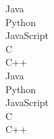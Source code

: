 \documentclass[]{friggeri-cv} %
\begin{document}
\noindent\begin{minipage}[t]{0.5\linewidth}
\begin{flushright}

Java\quad{\color{red} $\varheartsuit\varheartsuit\varheartsuit\varheartsuit\varheartsuit\varheartsuit\varheartsuit\varheartsuit\varheartsuit\varheartsuit\varheartsuit\varheartsuit\varheartsuit\varheartsuit\varheartsuit$}{\color{black} $\varheartsuit$} \\
Python\quad{\color{red} $\varheartsuit\varheartsuit\varheartsuit\varheartsuit\varheartsuit\varheartsuit\varheartsuit\varheartsuit\varheartsuit\varheartsuit\varheartsuit\varheartsuit\varheartsuit$}{\color{black} $\varheartsuit\varheartsuit\varheartsuit$} \\ 
JavaScript\quad{\color{red} $\varheartsuit\varheartsuit\varheartsuit\varheartsuit\varheartsuit\varheartsuit\varheartsuit\varheartsuit\varheartsuit\varheartsuit\varheartsuit\varheartsuit\varheartsuit\varheartsuit$}{\color{black} $\varheartsuit\varheartsuit$} \\ 
 C\quad{\color{red} $\varheartsuit\varheartsuit\varheartsuit\varheartsuit\varheartsuit\varheartsuit\varheartsuit\varheartsuit\varheartsuit\varheartsuit\varheartsuit\varheartsuit\varheartsuit\varheartsuit$}{\color{black} $\varheartsuit\varheartsuit$} \\
 C++\quad{\color{red} $\varheartsuit\varheartsuit\varheartsuit\varheartsuit\varheartsuit\varheartsuit\varheartsuit\varheartsuit\varheartsuit\varheartsuit\varheartsuit\varheartsuit\varheartsuit\varheartsuit$}{\color{black} $\varheartsuit\varheartsuit$} \\
Java\quad{\color{red} $\varheartsuit\varheartsuit\varheartsuit\varheartsuit\varheartsuit\varheartsuit\varheartsuit\varheartsuit\varheartsuit\varheartsuit\varheartsuit\varheartsuit\varheartsuit\varheartsuit\varheartsuit$}{\color{black} $\varheartsuit$} \\
Python\quad{\color{red} $\varheartsuit\varheartsuit\varheartsuit\varheartsuit\varheartsuit\varheartsuit\varheartsuit\varheartsuit\varheartsuit\varheartsuit\varheartsuit\varheartsuit\varheartsuit$}{\color{black} $\varheartsuit\varheartsuit\varheartsuit$} \\ 
JavaScript\quad{\color{red} $\varheartsuit\varheartsuit\varheartsuit\varheartsuit\varheartsuit\varheartsuit\varheartsuit\varheartsuit\varheartsuit\varheartsuit\varheartsuit\varheartsuit\varheartsuit\varheartsuit$}{\color{black} $\varheartsuit\varheartsuit$} \\ 
 C\quad{\color{red} $\varheartsuit\varheartsuit\varheartsuit\varheartsuit\varheartsuit\varheartsuit\varheartsuit\varheartsuit\varheartsuit\varheartsuit\varheartsuit\varheartsuit\varheartsuit\varheartsuit$}{\color{black} $\varheartsuit\varheartsuit$} \\
 C++\quad{\color{red} $\varheartsuit\varheartsuit\varheartsuit\varheartsuit\varheartsuit\varheartsuit\varheartsuit\varheartsuit\varheartsuit\varheartsuit\varheartsuit\varheartsuit\varheartsuit\varheartsuit$}{\color{black} $\varheartsuit\varheartsuit$} \\
 \end{flushright}

    \end{minipage}%
\end{document}
